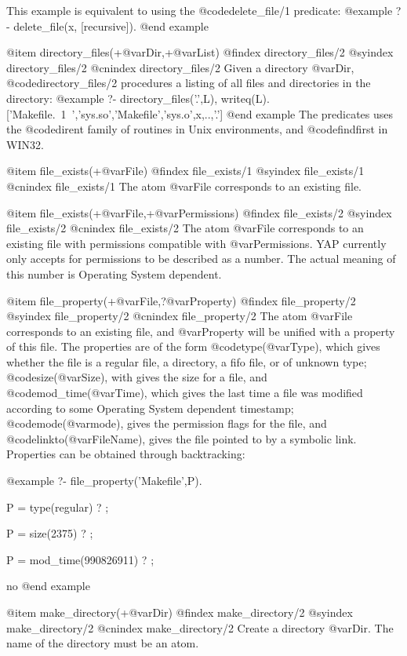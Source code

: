 This example is equivalent to using the @code{delete_file/1} predicate:
@example
   ?- delete_file(x, [recursive]).
@end example


@item directory_files(+@var{Dir},+@var{List})
@findex  directory_files/2
@syindex directory_files/2
@cnindex directory_files/2
Given a directory @var{Dir},  @code{directory_files/2} procedures a
listing of all files and directories in the directory:
@example
    ?- directory_files('.',L), writeq(L).
['Makefile.~1~','sys.so','Makefile','sys.o',x,..,'.']
@end example
The predicates uses the @code{dirent} family of routines in Unix
environments, and @code{findfirst} in WIN32.

@item file_exists(+@var{File})
@findex  file_exists/1
@syindex file_exists/1
@cnindex file_exists/1
The atom @var{File} corresponds to an existing file.

@item file_exists(+@var{File},+@var{Permissions})
@findex  file_exists/2
@syindex file_exists/2
@cnindex file_exists/2
The atom @var{File} corresponds to an existing file with permissions
compatible with @var{Permissions}. YAP currently only accepts for
permissions to be described as a number. The actual meaning of this
number is Operating System dependent.

@item file_property(+@var{File},?@var{Property})
@findex  file_property/2
@syindex file_property/2
@cnindex file_property/2
The atom @var{File} corresponds to an existing file, and @var{Property}
will be unified with a property of this file. The properties are of the
form @code{type(@var{Type})}, which gives whether the file is a regular
file, a directory, a fifo file, or of unknown type;
@code{size(@var{Size})}, with gives the size for a file, and
@code{mod_time(@var{Time})}, which gives the last time a file was
modified according to some Operating System dependent
timestamp; @code{mode(@var{mode})}, gives the permission flags for the
file, and @code{linkto(@var{FileName})}, gives the file pointed to by a
symbolic link. Properties can be obtained through backtracking:

@example
   ?- file_property('Makefile',P).

P = type(regular) ? ;

P = size(2375) ? ;

P = mod_time(990826911) ? ;

no
@end example

@item make_directory(+@var{Dir})
@findex  make_directory/2
@syindex make_directory/2
@cnindex make_directory/2
Create a directory @var{Dir}. The name of the directory must be an atom.

